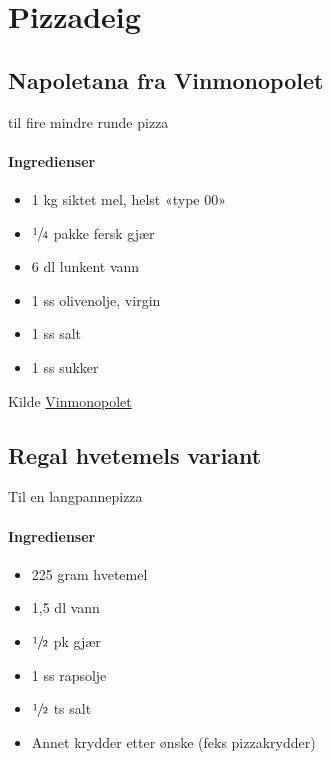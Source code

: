 \section{Pizzadeig}

\subsection{Napoletana fra Vinmonopolet}
til fire mindre runde pizza
\paragraph{Ingredienser}
\begin{itemize}[noitemsep]
	\item 1 kg siktet mel, helst «type 00»
	\item $\sfrac{1}{4}$  pakke fersk gjær
	\item 6 dl lunkent vann
	\item 1 ss olivenolje, virgin
	\item 1 ss salt
	\item 1 ss sukker
\end{itemize}


Kilde \href{http://www.vinmonopolet.no/artikkel/mat-og-drikke/kombinasjoner-med-mat/pizza/drikke-til-pizza}{Vinmonopolet}


\subsection{Regal hvetemels variant}
Til en langpannepizza

\paragraph{Ingredienser}
\begin{itemize}[noitemsep]
	\item 225 gram hvetemel
	\item 1,5 dl vann
	\item $\sfrac{1}{2}$ pk gjær
	\item 1 ss rapsolje
	\item $\sfrac{1}{2}$ ts salt
	\item Annet krydder etter ønske (feks pizzakrydder)
\end{itemize}

